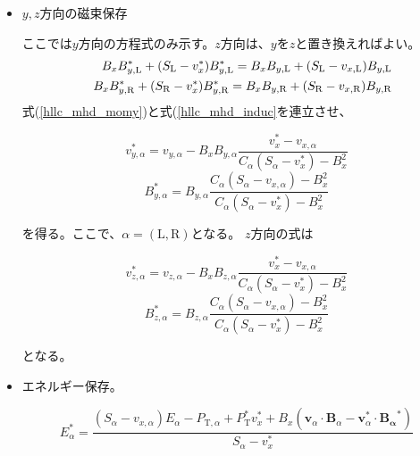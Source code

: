\begin{itemize}
\item $y,z$方向の磁束保存

ここでは$y$方向の方程式のみ示す。$z$方向は、$y$を$z$と置き換えればよい。
\begin{eqnarray}
&&B_x B_{y,\mathrm{L}}^* + (S_\mathrm{L} - v_x^*)B_{y,\mathrm{L}}^*
= B_x B_{y,\mathrm{L}} + (S_\mathrm{L} - v_{x,\mathrm{L}}) B_{y,\mathrm{L}}\\
&&B_x B_{y,\mathrm{R}}^* + (S_\mathrm{R} - v_x^*)B_{y,\mathrm{R}}^*
= B_x B_{y,\mathrm{R}} + (S_\mathrm{R} - v_{x,\mathrm{R}}) B_{y,\mathrm{R}}
    \label{hllc_mhd_induc}
\end{eqnarray}
式(\ref{hllc_mhd_momy})と式(\ref{hllc_mhd_induc}を連立させ、
\begin{screen}
\begin{equation}
v_{y,\alpha}^* = v_{y,\alpha}
- B_x B_{y,\alpha} \frac{ v_{x}^* - v_{x,\alpha} } {
C_\alpha (S_\alpha - v_x^*) - B_x^2
}
\end{equation}
\begin{equation}
B_{y,\alpha}^* = B_{y,\alpha}
\frac{ C_\alpha(S_\alpha - v_{x,\alpha}) - B_x^2  } {
C_\alpha (S_\alpha - v_x^*) - B_x^2
}
\end{equation}
\end{screen}
を得る。ここで、$\alpha=(\mathrm{L},\mathrm{R})$となる。
$z$方向の式は
\begin{screen}
\begin{equation}
v_{z,\alpha}^* = v_{z,\alpha}
- B_x B_{z,\alpha} \frac{ v_{x}^* - v_{x,\alpha} } {
C_\alpha (S_\alpha - v_x^*) - B_x^2
}
\end{equation}
\begin{equation}
B_{z,\alpha}^* = B_{z,\alpha}
\frac{ C_\alpha(S_\alpha - v_{x,\alpha}) - B_x^2  } {
C_\alpha (S_\alpha - v_x^*) - B_x^2
}
\end{equation}
\end{screen}
となる。

\item エネルギー保存。

\begin{screen}
\begin{equation}
E_\alpha^* 
= \frac{
(S_\alpha - v_{x,\alpha})E_\alpha - P_{\mathrm{T},\alpha} 
+ P_\mathrm{T}^* v_{x}^* 
+ B_x (\bm{ v}_\alpha \cdot \bm{ B}_\alpha - \bm{ v}_\alpha^* \cdot \bm{ B_\alpha}^*) }
{S_\alpha - v_x^*}
\end{equation}
\end{screen}


\end{itemize}

